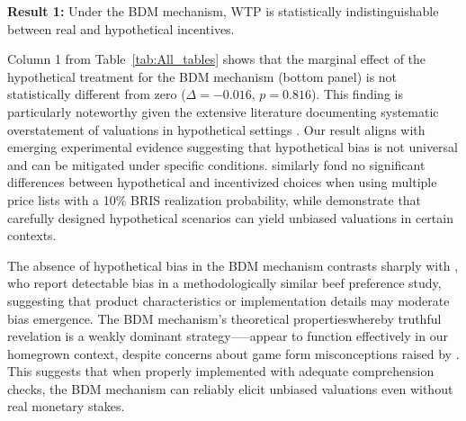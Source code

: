 \documentclass[12pt]{article}
\begin{document}

\textbf{Result 1:} Under the BDM mechanism, WTP is statistically indistinguishable between real and hypothetical incentives.

Column 1 from Table~\ref{tab:All_tables} shows that the marginal effect of the hypothetical treatment for the BDM mechanism (bottom panel) is not statistically different from zero (\(\Delta = -0.016\), \(p =0.816\)). This finding is particularly noteworthy given the extensive literature documenting systematic overstatement of valuations in hypothetical settings \citep{penn2018understanding, loomis_whats_2011}.
Our result aligns with emerging experimental evidence suggesting that hypothetical bias is not universal and can be mitigated under specific conditions. \citet{branas-garza_paid_2023} similarly fond no significant differences between hypothetical and incentivized choices when using multiple price lists with a 10\% BRIS realization probability, while \citet{drichoutis_incentives_2025} demonstrate that carefully designed hypothetical scenarios can yield unbiased valuations in certain contexts.

The absence of hypothetical bias in the BDM mechanism contrasts sharply with \citet{ahles_testing_2024}, who report detectable bias in a methodologically similar beef preference study, suggesting that product characteristics or implementation details may moderate bias emergence.
 The BDM mechanism's theoretical properties\textemdash whereby truthful revelation is a weakly dominant strategy—--appear to function effectively in our homegrown context, despite concerns about game form misconceptions raised by \citet{cason_misconceptions_2014}. This suggests that when properly implemented with adequate comprehension checks, the BDM mechanism can reliably elicit unbiased valuations even without real monetary stakes.



 
\vspace{0.5cm}

\end{document}
